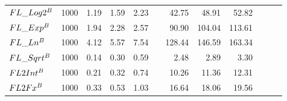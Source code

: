 \begin{table}
{\begin{tabular}{ l c r r r r r r r r r r}
            $FL\_Log2^{B}$                         & 1000    & 1.19                    & 1.59      & 2.23                    &  & 42.75       & 48.91       & 52.82       \\
            $FL\_Exp^{B}$                          & 1000    & 1.94                    & 2.28      & 2.57                    &  & 90.90       & 104.04      & 113.61      \\
            $FL\_Ln^{B}$                           & 1000    & 4.12                    & 5.57      & 7.54                    &  & 128.44      & 146.59      & 163.34      \\
            $FL\_Sqrt^{B}$                         & 1000    & 0.14                    & 0.30      & 0.59                    &  & 2.48        & 2.89        & 3.30        \\
            $FL2Int^{B}$                           & 1000    & 0.21                    & 0.32      & 0.74                    &  & 10.26       & 11.36       & 12.31       \\
            $FL2Fx^{B}$                            & 1000    & 0.33                    & 0.53      & 1.03                    &  & 16.64       & 18.06       & 19.56       \\
            \bottomrule
        \end{tabular}
    }
\end{table}
\FloatBarrier

